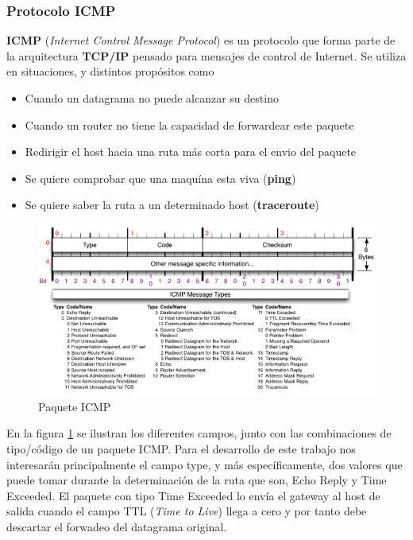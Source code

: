 \subsubsection{Protocolo \textbf{ICMP}}

\textbf{ICMP}\cite{rfc792} (\emph{Internet Control Message Protocol}) es un protocolo que
forma parte de la arquitectura \textbf{TCP/IP} pensado para mensajes de control
de Internet. Se utiliza en situaciones, y distintos propósitos como

\begin{itemize}
	\item Cuando un datagrama no puede alcanzar su destino
	\item Cuando un router no tiene la capacidad de forwardear este paquete
	\item Redirigir el host hacia una ruta más corta para el envio del paquete
	\item Se quiere comprobar que una maquína esta viva (\textbf{ping})
	\item Se quiere saber la ruta a un determinado host (\textbf{traceroute})
\end{itemize}

\begin{figure}[ht]
	\begin{center}
		\includegraphics[width=0.8\columnwidth]{imagenes/icmp.png}
		\caption{Paquete ICMP}
		\label{fig:picmp}
	\end{center}
\end{figure}

En la figura \ref{fig:picmp} se ilustran los diferentes campos, junto con
las combinaciones de tipo/código de un paquete
ICMP. Para el desarrollo de este trabajo nos interesarán principalmente
el campo type, y más específicamente, dos valores que puede tomar durante
la determinación de la ruta que son, Echo Reply y
Time Exceeded. El paquete con tipo Time Exceeded lo envía el gateway al host
de salida cuando el campo TTL (\emph{Time to Live}) llega a cero y
por tanto debe descartar el forwadeo del datagrama original.


